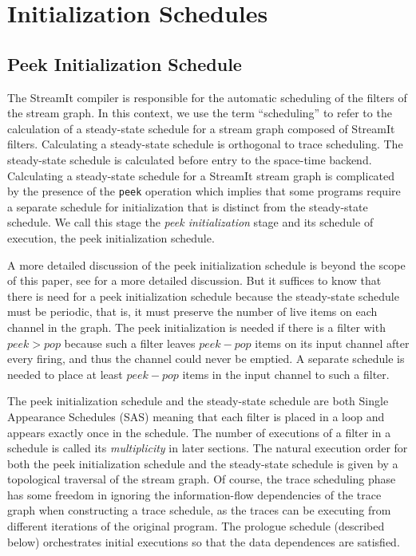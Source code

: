 \section{Initialization Schedules}
\subsection{Peek Initialization Schedule}
The StreamIt compiler is responsible for the automatic scheduling of
the filters of the stream graph. In this context, we use the term
``scheduling'' to refer to the calculation of a steady-state schedule for
a stream graph composed of StreamIt filters.  Calculating a
steady-state schedule is orthogonal to trace scheduling. The
steady-state schedule is calculated before entry to the space-time
backend.  Calculating a steady-state schedule for a StreamIt stream
graph is complicated by the presence of the {\tt peek} operation which
implies that some programs require a separate schedule for
initialization that is distinct from the steady-state schedule.  We
call this stage the {\it peek initialization} stage and its schedule
of execution, the {peek initialization schedule}.

A more detailed discussion of the peek initialization schedule is
beyond the scope of this paper, see \cite{streamitcc} for a more
detailed discussion.  But it suffices to know that there is
need for a peek initialization schedule because the steady-state schedule
must be periodic, that is, it must preserve the number of live items on
each channel in the graph.  The peek initialization is needed if there
is a filter with $peek > pop$ because such a filter leaves $peek -
pop$ items on its input channel after every firing, and thus the
channel could never be emptied.  A separate schedule is needed to
place at least $peek - pop$ items in the input channel to such a filter.

The peek initialization schedule and the steady-state schedule are
both Single Appearance Schedules (SAS) meaning that each filter is
placed in a loop and appears exactly once in the schedule.  The number
of executions of a filter in a schedule is called its {\it
multiplicity} in later sections.  The natural execution order for both
the peek initialization schedule and the steady-state schedule is
given by a topological traversal of the stream graph. Of course, the
trace scheduling phase has some freedom in ignoring the
information-flow dependencies of the trace graph when constructing a
trace schedule, as the traces can be executing from different
iterations of the original program.  The prologue schedule (described
below) orchestrates initial executions so that the data dependences
are satisfied.

